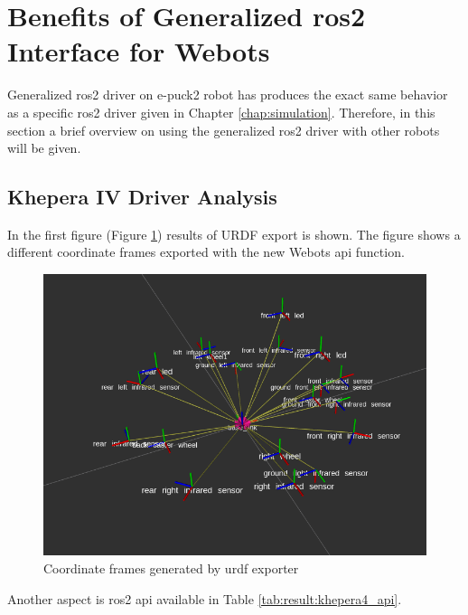 \section{Benefits of Generalized \ac{ros2} Interface for Webots}

Generalized \ac{ros2} driver on e-puck2 robot has produces the exact same behavior as a specific \ac{ros2} driver given in Chapter \ref{chap:simulation}.
Therefore, in this section a brief overview on using the generalized \ac{ros2} driver with other robots will be given.

\subsection{Khepera IV Driver Analysis}

In the first figure (Figure \ref{fig:results:khepera4_transforms}) results of URDF export is shown.
The figure shows a different coordinate frames exported with the new Webots \ac{api} function.

\begin{figure}[H]
    \centering
    \includegraphics[width=1\textwidth]{./results/figures/khepera4_transforms}
    \caption{Coordinate frames generated by \ac{urdf} exporter}
    \label{fig:results:khepera4_transforms}
\end{figure}

Another aspect is \ac{ros2} \ac{api} available in Table \ref{tab:result:khepera4_api}.

